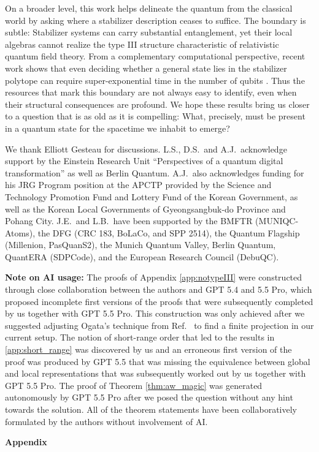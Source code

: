 \documentclass[aps,pra,reprint,superscriptaddress]{revtex4-2}
\let\origcontentsline\addcontentsline
\newcommand\resumetoc{\let\addcontentsline\origcontentsline}
\theoremstyle{definition}
\theoremstyle{remark}
\begin{document}
On a broader level, this work helps delineate the quantum from the classical world by asking where a stabilizer description ceases to suffice. The boundary is subtle: Stabilizer systems can carry substantial entanglement, yet their local algebras cannot realize the type III structure characteristic of relativistic quantum field theory. From a complementary computational perspective, recent work shows that even deciding whether a general state lies in the stabilizer polytope can require super-exponential time in the number of qubits \cite{Leone:2026kxv}. Thus the resources that mark this boundary are not always easy to identify, even when their structural consequences are profound. We hope these results bring us closer to a question that is as old as it is compelling: What, precisely, must be present in a quantum state for the spacetime we inhabit to emerge?

\begin{acknowledgments}
We thank Elliott Gesteau for discussions. L.S., D.S.\ and A.J.\ acknowledge support by the Einstein Research Unit ``Perspectives of a quantum digital transformation'' as well as Berlin Quantum.
A.J.\ also acknowledges funding for his JRG Program position at the APCTP provided by the Science and Technology Promotion Fund and Lottery Fund of the Korean Government, as well as the Korean Local Governments of Gyeongsangbuk-do Province and Pohang City.
J.E.\ and L.B.\ have been supported by the BMFTR (MUNIQC-Atoms), the DFG (CRC 183, BoLaCo, and SPP 2514), the Quantum Flagship (Millenion, PasQuanS2), the Munich Quantum Valley, Berlin Quantum, QuantERA (SDPCode), and the European Research Council (DebuQC).\smallskip

\textbf{Note on AI usage:} The proofs of Appendix \ref{app:notypeIII} were constructed through close collaboration between the authors and GPT 5.4 and 5.5 Pro, which proposed incomplete first versions of the proofs that were subsequently completed by us together with GPT 5.5 Pro. This construction was only achieved after we suggested adjusting Ogata's technique from 
Ref.\ \cite{Ogata:2022qdm} to find a finite projection in our current setup. The notion of short-range order that led to the results in \ref{app:short_range} was discovered by us and an erroneous first version of the proof was produced by GPT 5.5 that was missing the equivalence between global and local representations that was subsequently worked out by us together with GPT 5.5 Pro. The proof of Theorem \ref{thm:aw_magic} was generated autonomously by GPT 5.5 Pro after we posed the question without any hint towards the solution. All of the theorem statements have been collaboratively formulated by the authors without involvement of AI.

\end{acknowledgments}
\onecolumngrid
\clearpage
\appendix
\setcounter{secnumdepth}{2}
\setcounter{tocdepth}{2}
\renewcommand{\thesubsection}{\thesection.\arabic{subsection}}
\renewcommand{\thesubsubsection}{\thesubsection.\alph{subsubsection}}
\makeatletter
\renewcommand{\p@subsection}{}
\renewcommand{\p@subsubsection}{}
\makeatother
\begin{center}
\textbf{\large Appendix}
\end{center}
\tableofcontents
\resumetoc
\newpage
\end{document}
